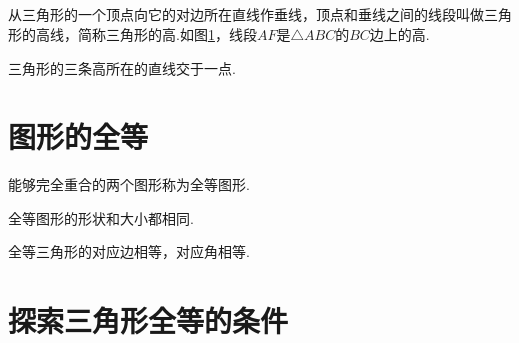 \documentclass[fontset=windows]{ctexrep}
\begin{document}
\subsection{}
从三角形的一个顶点向它的对边所在直线作垂线，顶点和垂线之间的线段叫做{\heiti 三角形的高线}，简称{\heiti 三角形的高}.如图\ref{fig:三角形高}，线段$AF$是$\triangle ABC$的$BC$边上的高.
\begin{figure}[htbp]
    \centering
    \caption{}
    \label{fig:三角形高}
\end{figure}
\par {\heiti 三角形的三条高所在的直线交于一点.}
\section{图形的全等}
\par 能够完全重合的两个图形称为{\heiti 全等图形}.
\par {\heiti 全等图形的形状和大小都相同.}
\par {\heiti 全等三角形的对应边相等，对应角相等.}
\section{探索三角形全等的条件}
\par 
\end{document}
